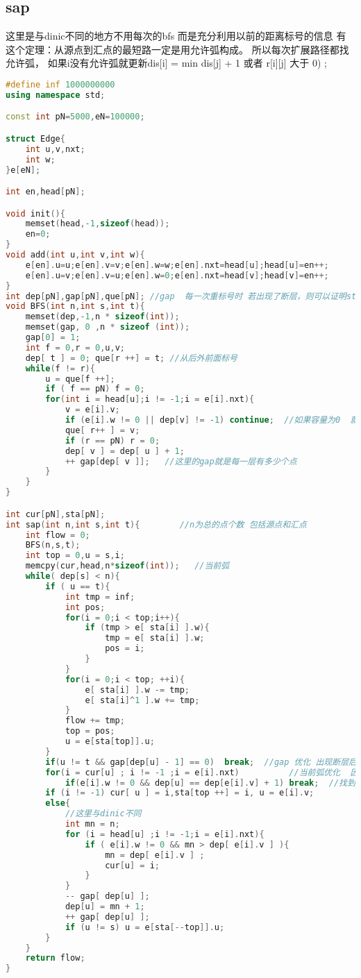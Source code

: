 \subsection{sap}
这里是与dinic不同的地方不用每次的bfs 而是充分利用以前的距离标号的信息
有这个定理：从源点到汇点的最短路一定是用允许弧构成。 
所以每次扩展路径都找允许弧，
如果i没有允许弧就更新dis[i] = min  dis[j] + 1 或者 r[i][j] 大于 0) ;
		\begin{lstlisting}[language=c++]
#define inf 1000000000
using namespace std;

const int pN=5000,eN=100000;

struct Edge{
	int u,v,nxt;
	int w;
}e[eN];

int en,head[pN];

void init(){
	memset(head,-1,sizeof(head));
	en=0;
}
void add(int u,int v,int w){
	e[en].u=u;e[en].v=v;e[en].w=w;e[en].nxt=head[u];head[u]=en++;
	e[en].u=v;e[en].v=u;e[en].w=0;e[en].nxt=head[v];head[v]=en++;
}
int dep[pN],gap[pN],que[pN]; //gap  每一次重标号时 若出现了断层，则可以证明st无可行流，此时可以直接退出算法
void BFS(int n,int s,int t){
	memset(dep,-1,n * sizeof(int));
	memset(gap, 0 ,n * sizeof (int));
	gap[0] = 1;
	int f = 0,r = 0,u,v;
	dep[ t ] = 0; que[r ++] = t; //从后外前面标号
	while(f != r){
		u = que[f ++];
		if ( f == pN) f = 0;
		for(int i = head[u];i != -1;i = e[i].nxt){
			v = e[i].v;
			if (e[i].w != 0 || dep[v] != -1) continue;  //如果容量为0  就根本到不到它
			que[ r++ ] = v;
			if (r == pN) r = 0;
			dep[ v ] = dep[ u ] + 1;
			++ gap[dep[ v ]];   //这里的gap就是每一层有多少个点
		}
	}
}

int cur[pN],sta[pN];
int sap(int n,int s,int t){        //n为总的点个数 包括源点和汇点
	int flow = 0;
	BFS(n,s,t);
	int top = 0,u = s,i;       
	memcpy(cur,head,n*sizeof(int));   //当前弧
	while( dep[s] < n){
		if ( u == t){
			int tmp = inf;
			int pos;     
			for(i = 0;i < top;i++){
				if (tmp > e[ sta[i] ].w){
					tmp = e[ sta[i] ].w;
					pos = i;
				}
			}
			for(i = 0;i < top; ++i){
				e[ sta[i] ].w -= tmp;
				e[ sta[i]^1 ].w += tmp;
			}
			flow += tmp;
			top = pos;
			u = e[sta[top]].u;
		}
		if(u != t && gap[dep[u] - 1] == 0)  break;  //gap 优化 出现断层后直接退出
		for(i = cur[u] ; i != -1 ;i = e[i].nxt)          //当前弧优化  因为以前的弧绝对不满足要求
			if(e[i].w != 0 && dep[u] == dep[e[i].v] + 1) break;  //找到了一条最短增广路
		if (i != -1) cur[ u ] = i,sta[top ++] = i, u = e[i].v;   
		else{                                     
			//这里与dinic不同
			int mn = n;
			for (i = head[u] ;i != -1;i = e[i].nxt){     
				if ( e[i].w != 0 && mn > dep[ e[i].v ] ){
					mn = dep[ e[i].v ] ;
					cur[u] = i;                          
				}
			}
			-- gap[ dep[u] ];  
			dep[u] = mn + 1;   
			++ gap[ dep[u] ];  
			if (u != s) u = e[sta[--top]].u;
		}
	}
	return flow;
}
	\end{lstlisting}